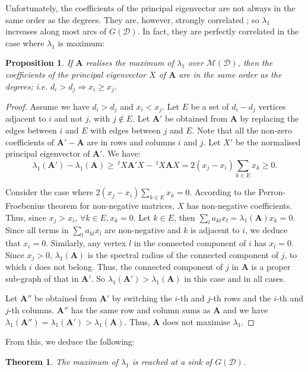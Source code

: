 \documentclass{article}
\newtheorem{theorem}{Theorem}
\newtheorem{prop}{Proposition}
\newcommand{\D}{\mathcal D}
\newcommand{\MM}{\mathcal M}
\renewcommand{\ll}{\lambda_1}
\newcommand{\imp}{\Rightarrow}
\newcommand{\A}{\mathbf A}
\begin{document}
Unfortunately, the coefficients of the principal eigenvector are not always in the same order as the degrees. They are, however, strongly correlated \cite{li2015correlation}; so $\ll$ increases along most arcs of $G(\D)$. In fact, they are perfectly correlated in the case where $\ll$ is maximum:

\begin{prop}\label{eigenvector order}
If $\A$ realises the maximum of $\ll$ over $\MM(\D)$, then the coefficients of the principal eigenvector $X$ of $\A$ are in the same order as the degrees; i.e. $d_i> d_j\imp x_i \geq x_j$.
\end{prop}

\begin{proof}
Assume we have $d_i> d_j$ and $x_i<x_j$. Let $E$ be a set of $d_i-d_j$ vertices adjacent to $i$ and not $j$, with $j\notin E$. Let $\A'$ be obtained from $\A$ by replacing the edges between $i$ and $E$ with edges between $j$ and $E$. Note that all the non-zero coefficients of $\A'-\A$ are in rows and columns $i$ and $j$. Let $X'$ be the normalised principal eigenvector of $\A'$. We have:
$$\ll(\A')-\ll(\A)\geq  ~^tX\A'X-~^tX\A X=2(x_j-x_i)\sum_{k\in E}x_k\geq 0. $$

Consider the case where $2(x_j-x_i)\sum_{k\in E}x_k= 0$. According to the Perron-Froebenius theorem for non-negative matrices, $X$ has non-negative coefficients. Thus, since $x_j>x_i$, $\forall k\in E, x_k=0$. Let $k\in E$, then $\sum_l a_{kl}x_l=\ll(\A)x_k=0$. Since all terms in $\sum_l a_{kl}x_l$ are non-negative and $k$ is adjacent to $i$, we deduce that $x_i=0$. Similarly, any vertex $l$ in the connected component of $i$ has $x_l=0$. Since $x_j>0$, $\ll(\A)$ is the spectral radius of the connected component of $j$, to which $i$ does not belong. Thus, the connected component of $j$ in $\A$ is a proper sub-graph of that in $\A'$. So $\ll(\A')>\ll(\A)$ in this case and in all cases. 

Let $\A''$ be obtained from $\A'$ by switching the $i$-th and $j$-th rows and the $i$-th and $j$-th columns. $\A''$ has the same row and column sums as $\A$ and we have $\ll(\A'')=\ll(\A')>\ll(\A)$. Thus, $\A$ does not maximise $\ll$.
\end{proof}

From this, we deduce the following:

\begin{theorem}\label{max radius}
The maximum of $\ll$ is reached at a sink of $G(\D)$.
\end{theorem}
\end{document}

